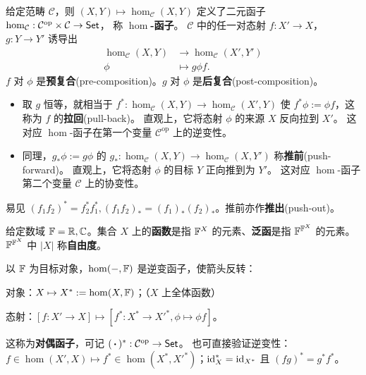 \begin{definition}\label{def:hom-functor}
		给定范畴 $\mathcal{C}$，则 $(X,Y) \mapsto \hom_{\mathcal{C}}(X, Y)$ 定义了二元函子 $\hom_{\mathcal{C}}: \mathcal{C}^\mathrm{op} \times \mathcal{C}  \to \mathsf{Set}$，
	称 \textbf{$\hom$-函子}。
	$\mathcal{C}$ 中的任一对态射 $f: X' \to X$，$g: Y \to Y'$ 诱导出
	\begin{align*}
		\hom_{\mathcal{C}}(X, Y) & \longrightarrow \hom_{\mathcal{C}}(X', Y') \\
		\phi & \longmapsto g \phi f .
	\end{align*}
	$f$ 对 $\phi$ 是\textbf{预复合}(pre-composition)。$g$ 对 $\phi$ 是\textbf{后复合}(post-composition)。
	\begin{itemize}
		\item 取 $g$ 恒等，就相当于 $f^*:\hom_{\mathcal{C}}(X, Y) \to \hom_{\mathcal{C}}(X', Y)$ 使 $f^* \phi := \phi f$，这称为 $f$ 的\textbf{拉回}(pull-back)。
	直观上，它将态射 $\phi$ 的来源 $X$ 反向拉到 $X'$。
	这对应 $\hom$-函子在第一个变量 $\mathcal{C}^\mathrm{op}$ 上的逆变性。
		\item 同理，$g_* \phi := g\phi$ 的 $g_*:\hom_{\mathcal{C}}(X, Y) \to \hom_{\mathcal{C}}(X, Y')$ 称\textbf{推前}(push-forward)。
	直观上，它将态射 $\phi$ 的目标 $Y$ 正向推到为 $Y'$。 
	这对应 $\hom$-函子第二个变量 $\mathcal{C}$ 上的协变性。
	\end{itemize}
\end{definition}
\begin{remark}
	易见 $(f_1 f_2)^* = f_2^* f_1^*, (f_1 f_2)_* = (f_1)_* (f_2)_*$。推前亦作\textbf{推出}(push-out)。
\end{remark}

\begin{definition}
    给定数域 $\mathbb{F}=\mathbb{R},\mathbb{C}$。集合 $X$ 上的\textbf{函数}是指 $\mathbb{F}^X$ 的元素、\textbf{泛函}是指 $\mathbb{F}^{\mathbb{F}^X}$ 的元素。$\mathbb{F}^{\mathbb{F}^X}$ 中 $|X|$ 称\textbf{自由度}。
\end{definition}

\begin{example}
	以 $\mathbb{F}$ 为目标对象，$\hom(-, \mathbb{F})$ 是逆变函子，使箭头反转：
	\begin{compactitem}
		\item 对象：$X \mapsto X^* := \hom(X, \mathbb{F})$；（$X$ 上全体函数）
		\item 态射：$[f:X'\to X] \mapsto [f^*: X^* \to X'^*, \phi\mapsto\phi f]$。
	\end{compactitem}
	这称为\textbf{对偶函子}，可记 $(\oo)^*: \mathcal{C}^\mathrm{op}\to \cate{Set}$。
	也可直接验证逆变性：$f\in\hom(X',X) \mapsto f^*\in\hom(X^*, X'^*)$；$\mathrm{id}_X^*=\mathrm{id}_{X^*}$ 且 $(f  g)^*=g^*  f^*$。
\end{example}

